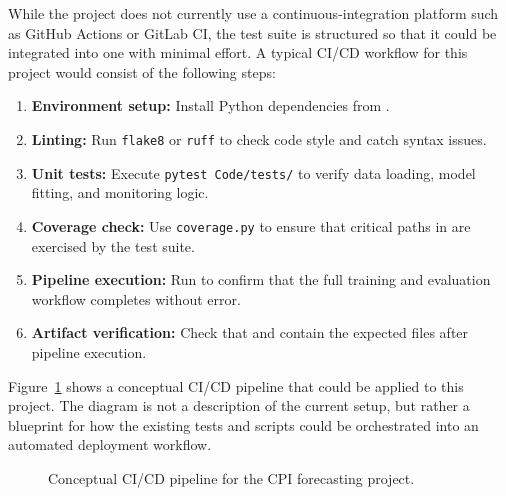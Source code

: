 While the project does not currently use a continuous-integration platform such as GitHub Actions or GitLab CI, the test suite is structured so that it could be integrated into one with minimal effort. A typical CI/CD workflow for this project would consist of the following steps:

\begin{enumerate}
    \item \textbf{Environment setup:} Install Python dependencies from .
    \item \textbf{Linting:} Run \texttt{flake8} or \texttt{ruff} to check code style and catch syntax issues.
    \item \textbf{Unit tests:} Execute \texttt{pytest Code/tests/} to verify data loading, model fitting, and monitoring logic.
    \item \textbf{Coverage check:} Use \texttt{coverage.py} to ensure that critical paths in  are exercised by the test suite.
    \item \textbf{Pipeline execution:} Run  to confirm that the full training and evaluation workflow completes without error.
    \item \textbf{Artifact verification:} Check that  and  contain the expected files after pipeline execution.
\end{enumerate}

Figure~\ref{fig:cicd-flow} shows a conceptual CI/CD pipeline that could be applied to this project. The diagram is not a description of the current setup, but rather a blueprint for how the existing tests and scripts could be orchestrated into an automated deployment workflow.

\begin{figure}[htbp]
    \centering
    \caption{Conceptual CI/CD pipeline for the CPI forecasting project.}
    \label{fig:cicd-flow}
\end{figure}

